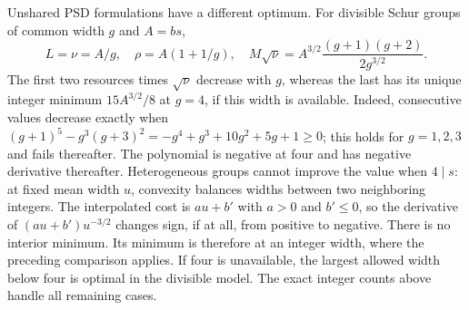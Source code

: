 Unshared PSD formulations have a different optimum. For divisible Schur groups of common width $g$ and $A=bs$,
\[
 L=\nu=A/g,\quad \rho=A(1+1/g),\quad
 M\sqrt\nu=A^{3/2}\frac{(g+1)(g+2)}{2g^{3/2}}.
\]
The first two resources times $\sqrt\nu$ decrease with $g$, whereas
the last has its unique integer minimum $15A^{3/2}/8$ at $g=4$, if this
width is available. Indeed, consecutive values decrease exactly when
$(g+1)^5-g^3(g+3)^2=-g^4+g^3+10g^2+5g+1\geq0$;
this holds for $g=1,2,3$ and fails thereafter. The polynomial is negative
at four and has negative derivative thereafter. Heterogeneous groups
cannot improve the value when $4\mid s$: at fixed mean width $u$, convexity
balances widths between two neighboring integers. The interpolated cost
is $au+b'$ with $a>0$ and $b'\leq0$, so the derivative of
$(au+b')u^{-3/2}$ changes sign, if at all, from positive to negative.
There is no interior minimum. Its minimum is therefore at an integer
width, where the preceding comparison applies. If four is unavailable,
the largest allowed width below four is optimal in the divisible model.
The exact integer counts above handle all remaining cases.
